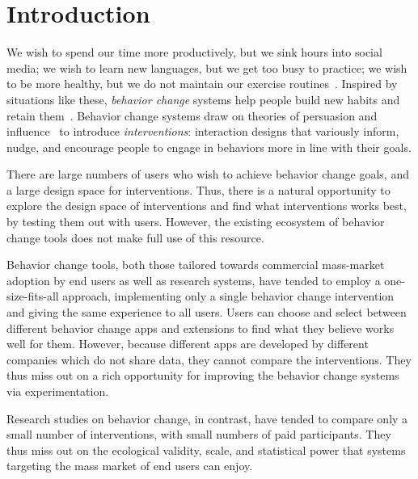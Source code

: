 \chapter{Introduction}

We wish to spend our time more productively, but we sink hours into social media; we wish to learn new languages, but we get too busy to practice; we wish to be more healthy, but we do not maintain our exercise routines~\cite{consolvo2009theory}. Inspired by situations like these, \textit{behavior change} systems help people build new habits and retain them~\cite{consolvo2008activity,froehlich2009ubigreen,kay2012lullaby,kim2016timeaware}. Behavior change systems draw on theories of persuasion and influence~\cite{fogg2002persuasive,cialdini1987influence} to introduce \textit{interventions}: interaction designs that variously inform, nudge, and encourage people to engage in behaviors more in line with their goals.

There are large numbers of users who wish to achieve behavior change goals, and a large design space for interventions. Thus, there is a natural opportunity to explore the design space of interventions and find what interventions works best, by testing them out with users. However, the existing ecosystem of behavior change tools does not make full use of this resource.

Behavior change tools, both those tailored towards commercial mass-market adoption by end users as well as research systems, have tended to employ a one-size-fits-all approach, implementing only a single behavior change intervention and giving the same experience to all users. Users can choose and select between different behavior change apps and extensions to find what they believe works well for them. However, because different apps are developed by different companies which do not share data, they cannot compare the interventions. They thus miss out on a rich opportunity for improving the behavior change systems via experimentation.

Research studies on behavior change, in contrast, have tended to compare only a small number of interventions, with small numbers of paid participants. They thus miss out on the ecological validity, scale, and statistical power that systems targeting the mass market of end users can enjoy.


